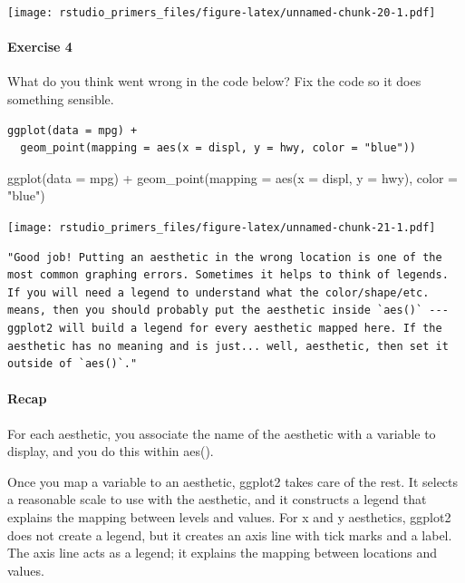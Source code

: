 \documentclass[
]{article}
\newenvironment{Shaded}{\begin{snugshade}}{\end{snugshade}}
\newcommand{\AttributeTok}[1]{\textcolor[rgb]{0.77,0.63,0.00}{#1}}
\newcommand{\FunctionTok}[1]{\textcolor[rgb]{0.00,0.00,0.00}{#1}}
\newcommand{\NormalTok}[1]{#1}
\newcommand{\SpecialCharTok}[1]{\textcolor[rgb]{0.00,0.00,0.00}{#1}}
\newcommand{\StringTok}[1]{\textcolor[rgb]{0.31,0.60,0.02}{#1}}
\begin{document}
\texttt{[image: rstudio\_primers\_files/figure-latex/unnamed-chunk-20-1.pdf]}

\hypertarget{exercise-4}{%
\paragraph{Exercise 4}\label{exercise-4}}

What do you think went wrong in the code below? Fix the code so it does
something sensible.

\begin{verbatim}
ggplot(data = mpg) +
  geom_point(mapping = aes(x = displ, y = hwy, color = "blue"))
\end{verbatim}

\begin{Shaded}
\begin{Highlighting}[]
\FunctionTok{ggplot}\NormalTok{(}\AttributeTok{data =}\NormalTok{ mpg) }\SpecialCharTok{+}
  \FunctionTok{geom\_point}\NormalTok{(}\AttributeTok{mapping =} \FunctionTok{aes}\NormalTok{(}\AttributeTok{x =}\NormalTok{ displ, }\AttributeTok{y =}\NormalTok{ hwy), }\AttributeTok{color =} \StringTok{"blue"}\NormalTok{)}
\end{Highlighting}
\end{Shaded}

\texttt{[image: rstudio\_primers\_files/figure-latex/unnamed-chunk-21-1.pdf]}

\begin{verbatim}
"Good job! Putting an aesthetic in the wrong location is one of the most common graphing errors. Sometimes it helps to think of legends. If you will need a legend to understand what the color/shape/etc. means, then you should probably put the aesthetic inside `aes()` --- ggplot2 will build a legend for every aesthetic mapped here. If the aesthetic has no meaning and is just... well, aesthetic, then set it outside of `aes()`."
\end{verbatim}

\hypertarget{recap}{%
\paragraph{Recap}\label{recap}}

For each aesthetic, you associate the name of the aesthetic with a
variable to display, and you do this within aes().

Once you map a variable to an aesthetic, ggplot2 takes care of the rest.
It selects a reasonable scale to use with the aesthetic, and it
constructs a legend that explains the mapping between levels and values.
For x and y aesthetics, ggplot2 does not create a legend, but it creates
an axis line with tick marks and a label. The axis line acts as a
legend; it explains the mapping between locations and values.
\end{document}
